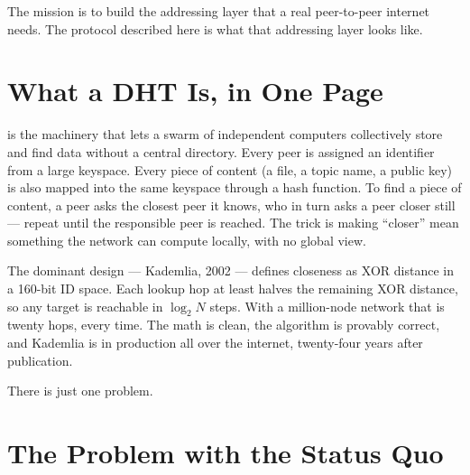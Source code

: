 \documentclass[twoside,nobib]{tufte-book}
\begin{document}
The mission is to build the addressing layer that a real peer-to-peer
internet needs. The protocol described here is what that addressing
layer looks like.

\section{What a DHT Is, in One Page}

 is the
machinery that lets a swarm of
independent computers collectively store and find data without a
central directory. Every peer is assigned an identifier from a large
keyspace. Every piece of content (a file, a topic name, a public key)
is also mapped into the same keyspace through a hash function. To
find a piece of content, a peer asks the closest peer it knows, who
in turn asks a peer closer still --- repeat until the responsible
peer is reached. The trick is making ``closer'' mean something the
network can compute locally, with no global view.

The dominant design --- Kademlia, 2002 --- defines closeness as XOR
distance in a 160-bit ID space. Each lookup
hop at least halves the remaining XOR distance, so any target is
reachable in $\log_2 N$ steps. With a million-node network that is
twenty hops, every time. The math is clean, the algorithm is
provably correct, and Kademlia is in production all over the
internet, twenty-four years after publication.

There is just one problem.

\section{The Problem with the Status Quo}
\end{document}
